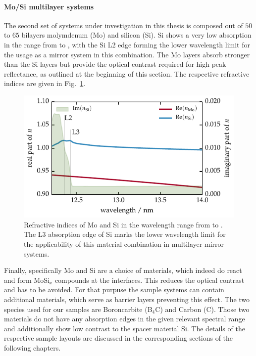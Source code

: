 \paragraph{Mo/Si multilayer systems}
The second set of systems under investigation in this thesis is composed out of $50$ to $65$ bilayers molymdenum (Mo) and silicon (Si). Si shows a very low absorption in the range from  to , with the Si L2 edge forming the lower wavelength limit for the usage as a mirror system in this combination. The Mo layers absorb stronger than the Si layers but provide the optical contrast required for high peak reflectance, as outlined at the beginning of this section. The respective refractive indices are given in Fig.~\ref{ch_exp:fig_mosi_contrast}.
\begin{figure}[htb]
        \includegraphics{img/Mo_Si_contrast}
        \caption[Refractive indices of Mo and Si in the wavelength range from  to .]{%
            Refractive indices of Mo and Si in the wavelength range from  to . The L3 absorption edge of Si marks the lower wavelength limit for the applicability of this material combination in multilayer mirror systems.}
        \label{ch_exp:fig_mosi_contrast}
\end{figure}

Finally, specifically Mo and Si are a choice of materials, which indeed do react and form MoSi$_x$ compounds at the interfaces. This reduces the optical contrast and has to be avoided. For that purpuse the sample systems can contain additional materials, which serve as barrier layers preventing this effect. The two species used for our samples are Boroncarbite (B$_4$C) and Carbon (C). Those two materials do not have any absorption edges in the given relevant spectral range and additionally show low contrast to the spacer material Si. The details of the respective sample layouts are discussed in the corresponding sections of the following chapters.

